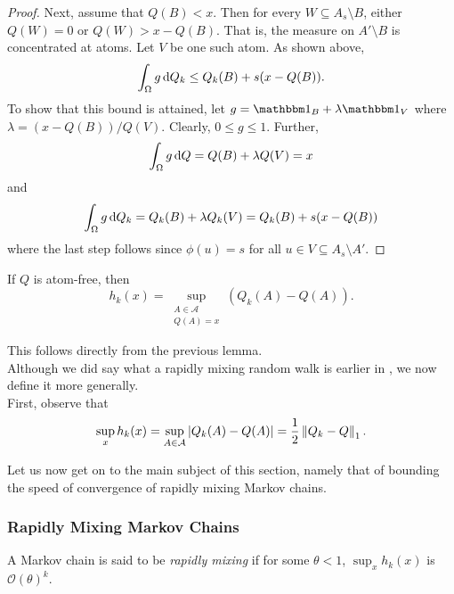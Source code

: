 \begin{proof}
Next, assume that $Q(B)<x$. Then for every $W\subseteq A_s\setminus B$, either $Q(W)=0$ or $Q(W)>x-Q(B)$. That is, the measure on $A'\setminus B$ is concentrated at atoms. Let $V$ be one such atom. As shown above,
\[ \int_\Omega g\operatorname{d}\!{Q}_k \leq Q_k(B) + s(x-Q(B)). \]
To show that this bound is attained, let $g=\indic_B+\lambda\indic_{V}$ where $\lambda = (x-Q(B))/Q(V)$. Clearly, $0\leq g\leq 1$. Further,
\[ \int_\Omega g\operatorname{d}\!{Q} = Q(B) + \lambda Q(V) = x \]
and
\[ \int_\Omega g\operatorname{d}\!{Q}_k = Q_k(B)+\lambda Q_k(V) = Q_k(B) + s(x-Q(B)) \]
where the last step follows since $\phi(u)=s$ for all $u\in V\subseteq A_s\setminus A'$.
\end{proof}

\begin{lemma}
If $Q$ is atom-free, then
\[ h_k(x) = \sup_{\substack{A\in\mathcal{A} \\ Q(A)=x}} \left(Q_k(A) - Q(A)\right). \]
\end{lemma}
This follows directly from the previous lemma.\\
Although we did say what a rapidly mixing random walk is earlier in , we now define it more generally.\\
First, observe that
\[ \sup_{x} h_k(x) = \sup_{A\in\mathcal{A}} |Q_k(A) - Q(A)| = \frac{1}{2}\left\lVert Q_k - Q\right\rVert_1. \]

Let us now get on to the main subject of this section, namely that of bounding the speed of convergence of rapidly mixing Markov chains.

\subsubsection{Rapidly Mixing Markov Chains}

\begin{fdef}
A Markov chain is said to be \textit{rapidly mixing} if for some $\theta<1$, $\sup_x h_k(x)$ is $\mathcal{O}(\theta)^k$.
\end{fdef}


